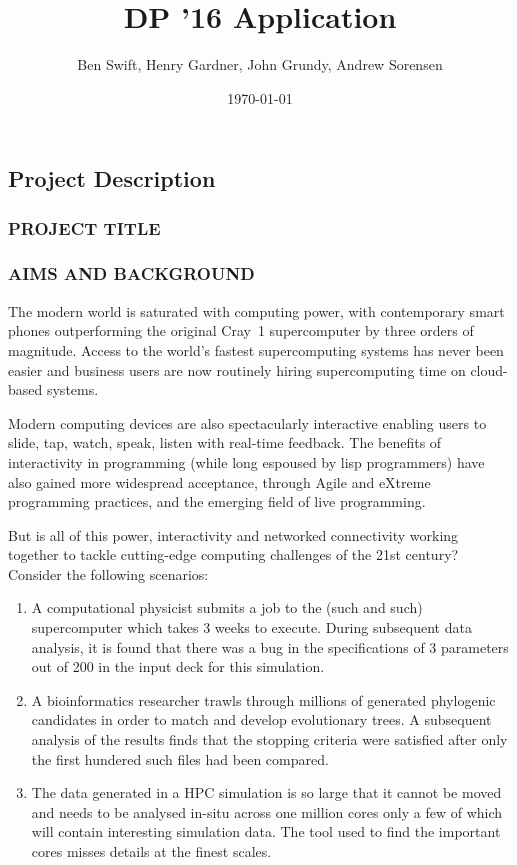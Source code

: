 \documentclass[a4paper]{scrartcl}
\author{Ben Swift, Henry Gardner, John Grundy, Andrew Sorensen}
\date{\today}
\title{DP '16 Application}
\begin{document}
\renewcommand{\thesection}{\Alph{section}}

\setcounter{section}{3} %
\subsection{Project Description}
\label{sec:project-description}

\subsubsection*{PROJECT TITLE}

\subsubsection*{AIMS AND BACKGROUND}

The modern world is saturated with computing power, with contemporary
smart phones outperforming the original Cray~1 supercomputer by three
orders of magnitude. Access to the world's fastest supercomputing
systems has never been easier and business users are now routinely
hiring supercomputing time on cloud-based systems.

Modern computing devices are also spectacularly interactive enabling
users to slide, tap, watch, speak, listen with real-time feedback. The
benefits of interactivity in programming (while long espoused by lisp
programmers) have also gained more widespread acceptance, through
Agile\parencite{Fowler2001} and eXtreme\parencite{Beck1999}
programming practices, and the emerging field of live
programming\parencite{Swift2013b}.

But is all of this power, interactivity and networked connectivity
working together to tackle cutting-edge computing challenges of the
21st century? Consider the following scenarios:
\begin{enumerate}
\item A computational physicist submits a job to the (such and
  such) supercomputer which takes 3 weeks to execute. During
  subsequent data analysis, it is found that there was a bug in the
  specifications of 3 parameters out of 200 in the input deck for this
  simulation.

\item A bioinformatics researcher trawls through millions of generated
  phylogenic candidates in order to match and develop evolutionary
  trees. A subsequent analysis of the results finds that the stopping
  criteria were satisfied after only the first hundered such files had
  been compared.

\item The data generated in a HPC simulation is so large that it
  cannot be moved and needs to be analysed in-situ across one million
  cores only a few of which will contain interesting simulation data.
  The tool used to find the important cores misses details at the
  finest scales.
\end{enumerate}
\end{document}
